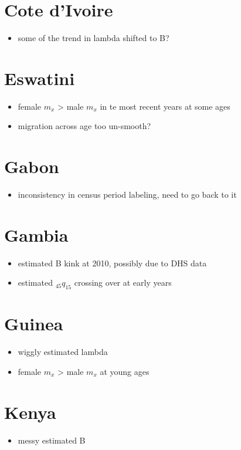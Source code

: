 \documentclass[12pt,a4paper]{article}
\begin{document}
\section*{Cote d'Ivoire}
\begin{itemize}
\item some of the trend in lambda shifted to B?
\end{itemize}

\section*{Eswatini}
\begin{itemize}
\item female $m_x$ > male $m_x$ in te most recent years at some ages
\item migration across age too un-smooth?
\end{itemize}

\section*{Gabon}
\begin{itemize}
\item inconsistency in census period labeling, need to go back to it
\end{itemize}

\section*{Gambia}
\begin{itemize}
\item estimated B kink at 2010, possibly due to DHS data
\item estimated $_{45}q_{15}$ crossing over at early years
\end{itemize}

\section*{Guinea}
\begin{itemize}
\item wiggly estimated lambda
\item female $m_x$ > male $m_x$ at young ages 
\end{itemize}

\section*{Kenya}
\begin{itemize}
\item messy estimated B
\end{itemize}
\end{document}
